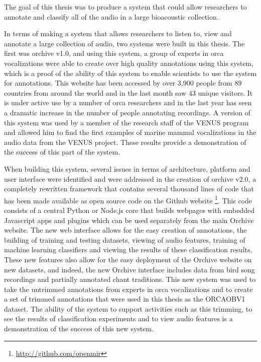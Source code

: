


\label{chap:conclusions}

The goal of this thesis was to produce a system that could allow
researchers to annotate and classify all of the audio in a large
bioacoustic collection.

In terms of making a system that allows researchers to listen to, view
and annotate a large collection of audio, two systems were built in
this thesis.  The first was orchive v1.0, and using this system, a
group of \totalExperts experts in orca vocalizations were able to
create over \totalAnnotations high quality annotations using this
system, which is a proof of the ability of this system to enable
scientists to use the system for annotations.  This website has been
accessed by over 3,900 people from 89 countries from around the world
and in the last month saw 43 unique visitors.  It is under active use
by a number of orca researchers and in the last year has seen a
dramatic increase in the number of people annotating recordings.  A
version of this system was used by a member of the research staff of
the VENUS program and allowed him to find the first examples of marine
mammal vocalizations in the audio data from the VENUS project.  These
results provide a demonstration of the success of this part of the
system.

When building this system, several issues in terms of architecture,
platform and user interface were identified and were addressed in the
creation of orchive v2.0, a completely rewritten framework that
contains several thousand lines of code that has been made available
as open source code on the Github
website \footnote{\url{http://github.com/openmir}}.  This code
consists of a central Python or Node.js core that builds webpages with
embedded Javascript apps and plugins which can be used separately from
the main Orchive website.  The new web interface allows for the easy
creation of annotations, the building of training and testing
datasets, viewing of audio features, training of machine learning
classifiers and viewing the results of these classification results.
These new features also allow for the easy deployment of the Orchive
website on new datasets, and indeed, the new Orchive interface
includes data from bird song recordings and partially annotated chant
traditions.  This new system was used to take the untrimmed
annotations from experts in orca vocalizations and to create a set of
trimmed annotations that were used in this thesis as the ORCAOBV1
dataset.  The ability of the system to support activities such as this
trimming, to see the results of classification experiments and to view
audio features is a demonstration of the success of this new system.

